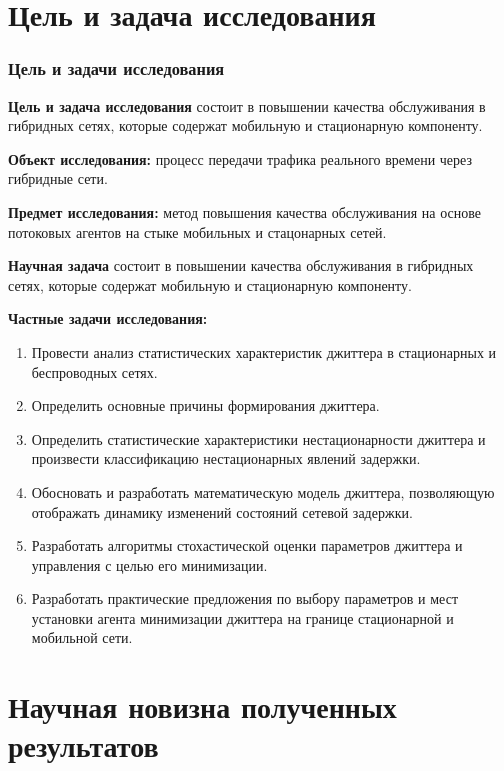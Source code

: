 \documentclass[10pt,pdf,hyperref={unicode}]{beamer}
\begin{document}
 

 
\section{Цель и задача исследования}

\begin{frame}
\frametitle{Цель и задачи исследования}
{\footnotesize
\textbf{Цель и задача исследования} состоит в повышении качества обслуживания в гибридных сетях, которые содержат мобильную и стационарную компоненту.

\textbf{Объект исследования:} процесс передачи трафика реального времени через гибридные сети.

\textbf{Предмет исследования:} метод повышения качества обслуживания на основе потоковых агентов на стыке мобильных и стацонарных сетей.

\textbf{Научная задача} состоит в повышении качества обслуживания в гибридных сетях, которые содержат мобильную и стационарную компоненту.

\textbf{Частные задачи исследования:}
}
{\scriptsize
\begin{enumerate}
  \item Провести анализ статистических характеристик джиттера в стационарных и беспроводных сетях.
  \item Определить основные причины формирования джиттера.
  \item Определить статистические характеристики нестационарности джиттера и произвести классификацию нестационарных явлений задержки.
  \item Обосновать и разработать математическую модель джиттера, позволяющую отображать динамику изменений состояний сетевой задержки.
  \item Разработать алгоритмы стохастической оценки параметров джиттера и управления с целью его минимизации.
  \item Разработать практические предложения по выбору параметров и мест установки агента минимизации джиттера на границе стационарной и мобильной сети.
\end{enumerate}
}

\end{frame}
 
\section{Научная новизна полученных результатов}
\end{document}

